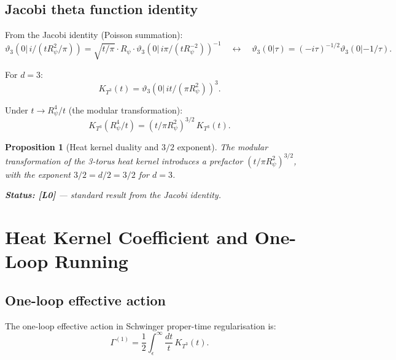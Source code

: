 \documentclass[11pt,a4paper]{article}
\newtheorem{proposition}{Proposition}
\begin{document}
\subsection{Jacobi theta function identity}

From the Jacobi identity (Poisson summation):
\begin{equation}
\label{eq:jacobi}
  \vartheta_3(0|\, i/(tR_\psi^2/\pi))
  = \sqrt{t/\pi} \cdot R_\psi \cdot \vartheta_3(0|\, i\pi/(t R_\psi^{-2}))^{-1}
  \quad \longleftrightarrow \quad
  \vartheta_3(0|\tau) = (-i\tau)^{-1/2}\vartheta_3(0|-1/\tau).
\end{equation}

For $d = 3$:
\begin{equation}
\label{eq:theta_3d}
  K_{T^3}(t) = \vartheta_3(0|\,it/(\pi R_\psi^2))^3.
\end{equation}

Under $t \to R_\psi^4/t$ (the modular transformation):
\begin{equation}
\label{eq:theta_dual}
  K_{T^3}(R_\psi^4/t)
  = (t/\pi R_\psi^2)^{3/2}\, K_{T^3}(t).
\end{equation}

\begin{proposition}[Heat kernel duality and $3/2$ exponent]\label{prop:hk_dual}
  The modular transformation of the 3-torus heat kernel introduces a prefactor
  $(t/\pi R_\psi^2)^{3/2}$, with the exponent $3/2 = d/2 = 3/2$ for $d=3$.

  \textbf{Status: [L0]} — standard result from the Jacobi identity.
\end{proposition}

\section{Heat Kernel Coefficient and One-Loop Running}
\label{sec:one_loop}

\subsection{One-loop effective action}

The one-loop effective action in Schwinger proper-time regularisation is:
\begin{equation}
\label{eq:schwinger}
  \Gamma^{(1)} = \frac{1}{2}\int_\epsilon^\infty \frac{dt}{t}\, K_{T^3}(t).
\end{equation}
\end{document}
